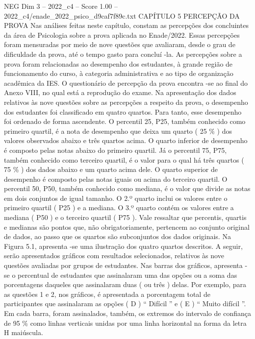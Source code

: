 \begin{textsample}{NEG Dim 3 – 2022\_c4 – Score 1.00 – 2022\_c4/enade\_2022\_psico\_d9caf7f89c.txt}  \label{ex:f3_neg_148}
CAPÍTULO 5 PERCEPÇÃO DA PROVA Nas análises feitas neste capítulo, constam as percepções dos concluintes da área de Psicologia sobre a prova aplicada no Enade/2022.
Essas percepções foram mensuradas por meio de nove questões que avaliaram, desde o grau de dificuldade da prova, até o tempo gasto para concluí -la.
As percepções sobre a prova foram relacionadas ao desempenho dos estudantes, à grande região de funcionamento do curso, à categoria administrativa e ao tipo de organização acadêmica da IES.
O questionário de percepção da prova encontra -se ao final do Anexo VIII, no qual está a reprodução do exame.
Na apresentação dos dados relativos às nove questões sobre as percepções a respeito da prova, o desempenho dos estudantes foi classificado em quatro quartos.
Para tanto, esse desempenho foi ordenado de forma ascendente.
O percentil 25, P25, também conhecido como primeiro quartil, é a nota de desempenho que deixa um quarto ( 25 \% ) dos valores observados abaixo e três quartos acima.
O quarto inferior de desempenho é composto pelas notas abaixo do primeiro quartil.
Já o percentil 75, P75, também conhecido como terceiro quartil, é o valor para o qual há três quartos ( 75 \% ) dos dados abaixo e um quarto acima dele.
O quarto superior de desempenho é composto pelas notas iguais ou acima do terceiro quartil.
O percentil 50, P50, também conhecido como mediana, é o valor que divide as notas em dois conjuntos de igual tamanho.
O 2.º quarto inclui os valores entre o primeiro quartil ( P25 ) e a mediana.
O 3.º quarto contém os valores entre a mediana ( P50 ) e o terceiro quartil ( P75 ).
Vale ressaltar que percentis, quartis e medianas são pontos que, não obrigatoriamente, pertencem ao conjunto original de dados, ao passo que os quartos são subconjuntos dos dados originais.
Na Figura 5.1, apresenta -se uma ilustração dos quatro quartos descritos.
A seguir, serão apresentados gráficos com resultados selecionados, relativos às nove questões avaliadas por grupos de estudantes.
Nas barras dos gráficos, apresenta -se o percentual de estudantes que assinalaram uma das opções ou a soma das porcentagens daqueles que assinalaram duas ( ou três ) delas.
Por exemplo, para as questões 1 e 2, nos gráficos, é apresentada a porcentagem total de participantes que assinalaram as opções ( D ) “ Difícil ” e ( E ) “ Muito difícil ”.
Em cada barra, foram assinalados, também, os extremos do intervalo de confiança de 95 \% como linhas verticais unidas por uma linha horizontal na forma da letra H maiúscula.

\end{textsample}
